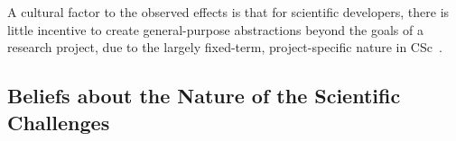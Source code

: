 \documentclass[conference,10pt]{IEEEtran}
\begin{document}
A cultural factor to the observed effects is that for scientific developers, there is little incentive to create general-purpose abstractions beyond the goals of a research project, due to the largely fixed-term, project-specific nature in CSc~\cite{johan18_secs}.

\subsection{Beliefs about the Nature of the Scientific Challenges}















\end{document}
